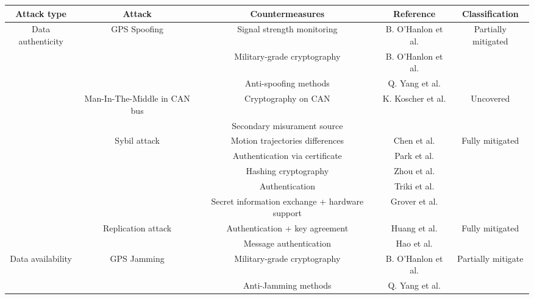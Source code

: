 \begin{table*}[t]
  \centering
  \begin{tabular}{*{5}{c}}
    \hline 
    Attack type & Attack & Countermeasures & Reference & Classification \\
    \hline
    
    
    Data authenticity & GPS Spoofing & Signal strength monitoring & B. O’Hanlon et al. & Partially mitigated\\
    
    &  & Military-grade cryptography & B. O’Hanlon et al. & \\
    
    & & Anti-spoofing methods & Q. Yang et al. & \\
    
    & Man-In-The-Middle in CAN bus & Cryptography on CAN & K. Koscher et al. & Uncovered \\
    
    & & Secondary misurament source & & \\
    
    & Sybil attack & Motion trajectories differences & Chen et al. & Fully mitigated\\
    
    & & Authentication via certificate & Park et al. & \\
    
    & & Hashing cryptography & Zhou et al. & \\
    
    & & Authentication & Triki et al. & \\
    
    & & Secret information exchange + hardware support & Grover et al. & \\
    
    & Replication attack & Authentication + key agreement & Huang et al. & Fully mitigated\\
    
    &  & Message authentication & Hao et al. & \\
    
    \hline
    
    Data availability & GPS Jamming & Military-grade cryptography & B. O’Hanlon et al. & Partially mitigate\\
    
    & & Anti-Jamming methods & Q. Yang et al. & \\
    

\end{tabular}
\end{table*}
